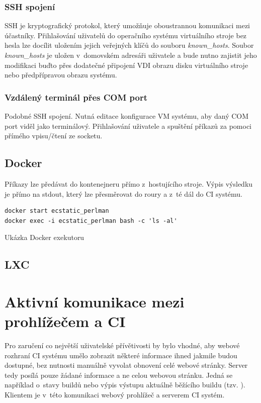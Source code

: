 \subsubsection{SSH spojení}

SSH je kryptografický protokol, který umožňuje oboustrannou komunikaci mezi účastníky.
Přihlašování uživatelů do operačního systému virtuálního stroje bez hesla lze docílit uložením jejich veřejných klíčů do souboru \textit{known\_hosts}.
Soubor \textit{known\_hosts} je uložen v~domovském adresáři uživatele a bude nutno zajistit jeho modifikaci buďto přes dodatečné připojení VDI obrazu disku virtuálního stroje nebo předpřípravou obrazu systému.

\subsubsection{Vzdálený terminál přes COM port}

Podobné SSH spojení.
Nutná editace konfigurace VM systému, aby daný COM port viděl jako terminálový.
Přihlašování uživatele a spuštění příkazů za pomoci přímého vpisu/čtení ze socketu.

\subsection{Docker}

Příkazy lze předávat do kontenejneru přímo z~hostujícího stroje.
Výpis výsledku je přímo na stdout, který lze přesměrovat do roury a z~té dál do CI systému.

\begin{listing}[ht]
\begin{verbatim}
docker start ecstatic_perlman
docker exec -i ecstatic_perlman bash -c 'ls -al' 
\end{verbatim}
\caption{Ukázka Docker exekutoru}
\label{docker-minimal-example}
\end{listing}

\subsection{LXC}

\section{Aktivní komunikace mezi prohlížečem a CI}

Pro zaručení co největší uživatelské přívětivosti by bylo vhodné, aby webové rozhraní CI systému umělo zobrazit některé informace ihned jakmile budou dostupné, bez nutnosti manuálně vyvolat obnovení celé webové stránky.
Server tedy posílá pouze žádané informace a ne celou webovou stránku.
Jedná se například o~stavy buildů nebo výpis výstupu aktuálně běžícího buildu (tzv. ).
Klientem je v~této komunikaci webový prohlížeč a serverem CI systém.

